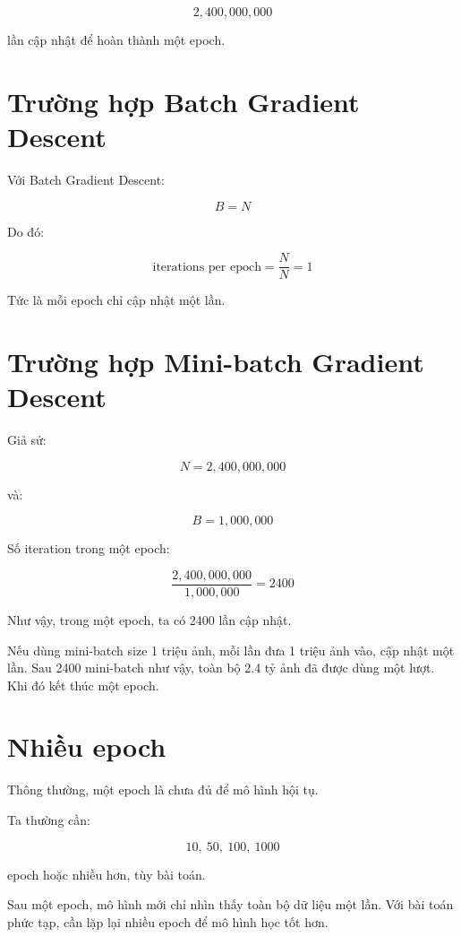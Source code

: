 \documentclass[12pt,a4paper]{report}
\begin{document}
\[
    2,400,000,000
\]

lần cập nhật để hoàn thành một epoch.

\section{Trường hợp Batch Gradient Descent}

Với Batch Gradient Descent:

\[
    B=N
\]

Do đó:

\[
    \text{iterations per epoch}
    =
    \frac{N}{N}
    =
    1
\]

Tức là mỗi epoch chỉ cập nhật một lần.

\section{Trường hợp Mini-batch Gradient Descent}

Giả sử:

\[
    N=2,400,000,000
\]

và:

\[
    B=1,000,000
\]

Số iteration trong một epoch:

\[
    \frac{2,400,000,000}{1,000,000}
    =
    2400
\]

Như vậy, trong một epoch, ta có 2400 lần cập nhật.

\begin{vidu}
Nếu dùng mini-batch size 1 triệu ảnh, mỗi lần đưa 1 triệu ảnh vào, cập nhật một lần. Sau 2400 mini-batch như vậy, toàn bộ 2.4 tỷ ảnh đã được dùng một lượt. Khi đó kết thúc một epoch.
\end{vidu}

\section{Nhiều epoch}

Thông thường, một epoch là chưa đủ để mô hình hội tụ.

Ta thường cần:

\[
    10,\ 50,\ 100,\ 1000
\]

epoch hoặc nhiều hơn, tùy bài toán.

\begin{ghinho}
Sau một epoch, mô hình mới chỉ nhìn thấy toàn bộ dữ liệu một lần. Với bài toán phức tạp, cần lặp lại nhiều epoch để mô hình học tốt hơn.
\end{ghinho}
\end{document}
